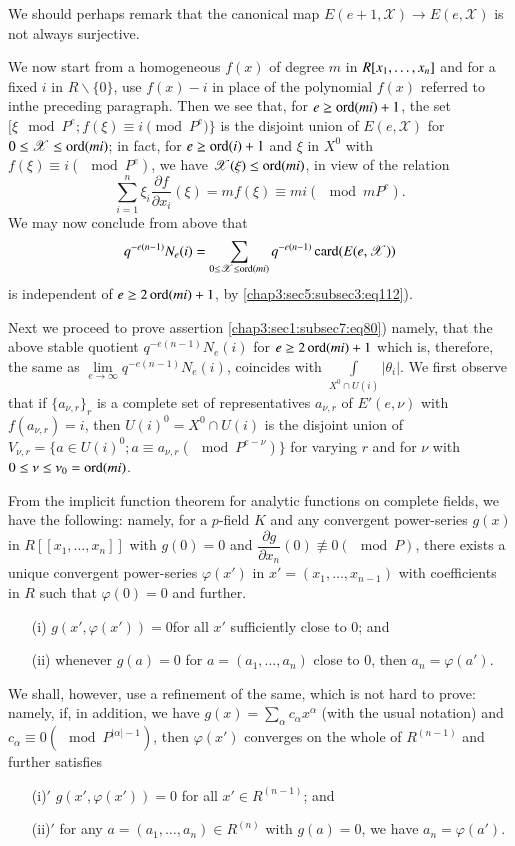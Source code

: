 We should perhaps remark that the canonical map $E(e+1,\mathscr{X})\to
E(e,\mathscr{X})$ is not always surjective.

We now start from a homogeneous $f(x)$ of degree $m$ in
$R[x_{1},\ldots,\break x_{n}]$ and for a fixed $i$ in $R\backslash\{0\}$, use
$f(x)-i$ in place of the polynomial $f(x)$ referred to
in\pageoriginale the preceding paragraph. Then we see that, for $e\geq
\operatorname{ord}(mi)+1$, the set $[\xi \mod P^{e};f(\xi)\equiv i \pmod{P^{e}}\}$ is
  the disjoint union of $E(e,\mathscr{X})$ for $0\leq \mathscr{X}\leq
  \operatorname{ord}(mi)$; in fact, for $e\geq \operatorname{ord}(i)+1$ and $\xi$ in $X^{0}$ with
  $f(\xi)\equiv i(\mod P^{e})$, we have
  $\mathscr{X}(\xi)\leq\operatorname{ord}(mi)$, in view of the relation
$$
\sum^{n}_{i=1}\xi_{i}\frac{\partial f}{\partial
  x_{i}}(\xi)=mf(\xi)\equiv mi(\mod mP^{e}).
$$
We may now conclude from above that
$$
q^{-e(n-1)}N_{e}(i)=\sum_{0\leq \mathscr{X}\leq
  \operatorname{ord}(mi)}q^{-e(n-1)}\operatorname{card} (E(e,\mathscr{X}))
$$
is independent of $e\geq 2\operatorname{ord} (mi)+1$, by \ref{chap3:sec5:subsec3:eq112}).

Next we proceed to prove assertion \ref{chap3:sec1:subsec7:eq80})
namely, that the above 
stable quotient $q^{-e(n-1)}N_{e}(i)$ for $e\geq 2\operatorname{ord}(mi)+1$ which
is, therefore, the same as
$\lim\limits_{e\to\infty}q^{-e(n-1)}N_{e}(i)$, coincides with
$\int\limits_{X^{0}\cap U(i)}|\theta_{i}|$. We first observe that if
$\{a_{\nu,r}\}_{r}$ is a complete set of representatives $a_{\nu,r}$
of $E'(e,\nu)$ with $f(a_{\nu,r})=i$, then $U(i)^{0}=X^{0}\cap U(i)$
is the disjoint union of $V_{\nu,r}=\{a\in U(i)^{0};a\equiv
a_{\nu,r}(\mod P^{e-\nu})\}$ for varying $r$ and for $\nu$ with $0\leq
\nu\leq \nu_{0}=\operatorname{ord}(mi)$.

From the implicit function theorem for analytic functions on complete
fields, we have the following: namely, for a $p$-field $K$ and any
convergent power-series $g(x)$ in $R[[x_{1},\ldots,x_{n}]]$ with
$g(0)=0$ and $\dfrac{\partial g}{\partial x_{n}}(0)\not\equiv 0(\mod
P)$, there exists a unique convergent power-series $\varphi(x')$ in
$x'=(x_{1},\ldots,x_{n-1})$ with coefficients in $R$ such that
$\varphi(0)=0$ and further.
\begin{itemize}
\item[(i)] $g(x',\varphi(x'))=0$\pageoriginale for all $x'$
  sufficiently close to $0$; and

\item[(ii)] whenever $g(a)=0$ for $a=(a_{1},\ldots,a_{n})$ close to
  $0$, then $a_{n}=\varphi(a')$.
\end{itemize}
We shall, however, use a refinement of the same, which is not hard to
prove: namely, if, in addition, we have
$g(x)=\sum\limits_{\alpha}c_{\alpha}x^{\alpha}$ (with the usual
notation) and $c_{\alpha}\equiv 0(\mod P^{|\alpha|-1})$, then
$\varphi(x')$ converges on the whole of $R^{(n-1)}$ and further
satisfies
\begin{itemize}
\item[(i)$'$] $g(x',\varphi(x'))=0$ for all $x'\in R^{(n-1)}$; and

\item[(ii)$'$] for any $a=(a_{1},\ldots,a_{n})\in R^{(n)}$ with
  $g(a)=0$, we have $a_{n}=\varphi(a')$.
\end{itemize}

